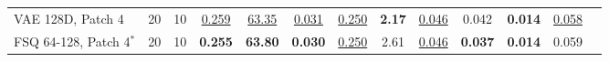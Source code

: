 \begin{table}[h]
{\begin{tabular}{l cc | cccc cccccc}
    VAE 128D, Patch 4 & 20 & 10 & \underline{0.259} & \underline{63.35} & \underline{0.031} & \underline{0.250} & \textbf{2.17} & \underline{0.046} & 0.042 & \textbf{0.014} & \underline{0.058} \\
    FSQ 64-128, Patch 4$^*$ & 20 & 10 & \textbf{0.255} & \textbf{63.80} & \textbf{0.030} & \underline{0.250} & 2.61 & 
    \underline{0.046} & \textbf{0.037} & \textbf{0.014} & 0.059 \\
    \bottomrule
    \end{tabular}
}
\label{tab:ablation_detailed}
\end{table}

